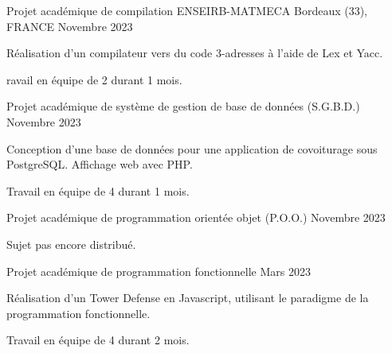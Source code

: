 

\begin{cventries}

  \cventry
    {Projet académique de compilation} %
    {ENSEIRB-MATMECA} %
    {Bordeaux (33), FRANCE} %
    {Novembre 2023} %
    {
      \begin{cvitems} %
        \item{Réalisation d'un compilateur vers du code 3-adresses à l'aide de Lex et Yacc.}
        \item{ravail en équipe de 2 durant 1 mois.}
      \end{cvitems}
    }

  \cventry
    {Projet académique de système de gestion de base de données (S.G.B.D.)} %
    {} %
    {} %
    {Novembre 2023} %
    {
      \begin{cvitems} %
        \item{Conception d'une base de données pour une application de covoiturage sous PostgreSQL. Affichage web avec PHP.}
        \item{Travail en équipe de 4 durant 1 mois.}
      \end{cvitems}
    }

  \cventry
    {Projet académique de programmation orientée objet (P.O.O.)} %
    {} %
    {} %
    {Novembre 2023} %
    {
      \begin{cvitems} %
        \item{Sujet pas encore distribué.}
      \end{cvitems}
    }

  \cventry
    {Projet académique de programmation fonctionnelle} %
    {} %
    {} %
    {Mars 2023} %
    {
      \begin{cvitems} %
        \item{Réalisation d'un Tower Defense en Javascript, utilisant le paradigme de la programmation fonctionnelle.}
        \item{Travail en équipe de 4 durant 2 mois.}
      \end{cvitems}
    }


\end{cventries}
